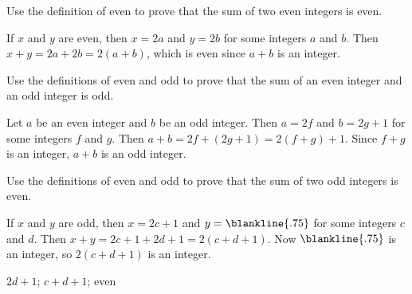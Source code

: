 \begin{exa}
Use the definition of even to prove that the sum of two even integers is even.
\begin{pf}
If $x$ and $y$ are even, then $x=2a$ and $y=2b$ for some integers $a$ and $b$. 
Then $x+y=2a + 2b = 2(a + b)$, which is even since $a+b$ is an integer.
\end{pf}
\end{exa}

\begin{exa}
Use the definitions of even and odd to prove that the sum of an even integer and an
odd integer is odd.
\begin{pf}
Let $a$ be an even integer and $b$ be an odd integer.
Then $a=2f$ and $b=2g + 1$ for some integers $f$ and $g$.
Then $a+b=2f + (2g + 1) = 2(f+g) + 1$. Since $f + g$
is an integer, $a+b$ is an odd integer.
\end{pf}
\end{exa}


\begin{fib}
Use the definitions of even and odd to prove that the sum of two odd integers is even.
\begin{pf}
If $x$ and $y$ are odd, then  $x=2c + 1$ and $y=\blankline{.75}$ for some integers $c$ and $d$. 
Then $x+y = 2c + 1 +2d + 1 = 2(c+ d+1)$.  Now $\blankline{.75}$ is an integer, so $2(c + d+1)$
is an  integer. 
\end{pf}
\begin{answer}
$2d+1$;
$c+d+1$;
even
\end{answer}
\end{fib}

%

